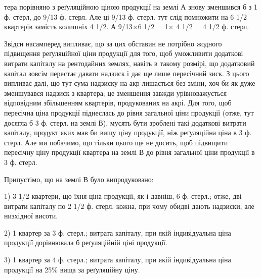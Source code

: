 тера порівняно з реґуляційною ціною продукції на землі А знову зменшився
б з 1 ф. стерл, до 9/13 ф. стерл. Але ці 9/13 ф. стерл. тут слід
помножити на 6 1/2 квартерів замість колишніх 4 1/2. А 9/13×6 1/2 = 1× 4 1/2 = 4 1/2 ф. стерл.

Звідси насамперед випливає, що за цих обставин не потрібно жодного підвищення
реґуляційної ціни продукції для того, щоб уможливити додаткові витрати
капіталу на рентодайних землях, навіть в такому розмірі, що додатковий
капітал зовсім перестає давати надзиск і дає ще лише пересічний зиск. З
цього випливає далі, що тут сума надзиску на акр лишається без зміни,
хоч би як дуже зменшувався надзиск з квартера; це зменшення завжди урівноважується
відповідним збільшенням квартерів, продукованих на акрі. Для того,
щоб пересічна ціна продукції піднеслась до рівня загальної ціни продукції (отже,
тут досягла б 3 ф. стерл. на землі В), мусять бути зроблені такі додаткові витрати
капіталу, продукт яких мав би вищу ціну продукції, ніж реґуляційна ціна
в 3 ф. стерл. Але ми побачимо, що тільки цього ще не досить, щоб підвищити
пересічну ціну продукції квартера на землі В до рівня загальної ціни продукції
в 3 ф. стерл.

Припустімо, що на землі В було випродуковано:

1) 3 1/2 квартери, що їхня ціна продукції, як і давніш, 6 ф. стерл.; отже,
дві витрати капіталу по  2 1/2 ф. стерл. кожна, при чому обидві дають надзиски,
але низхідної висоти.

2) 1 квартер за 3 ф. стерл.; витрата капіталу, при якій індивідуальна
ціна продукції дорівнювала б реґуляційній ціні продукції.

3) 1 квартер за 4 ф. стерл.; витрата капіталу, при якій індивідуальна
ціна продукції на 25\% вища за реґуляційну ціну.

